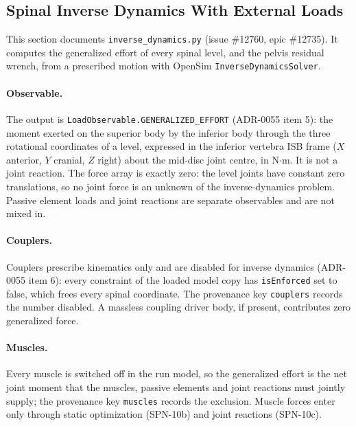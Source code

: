 \subsection{Spinal Inverse Dynamics With External Loads}
\label{sec:spn-10a}

This section documents \texttt{inverse\_dynamics.py} (issue \#12760, epic
\#12735). It computes the generalized effort of every spinal level, and the
pelvis residual wrench, from a prescribed motion with OpenSim
\texttt{InverseDynamicsSolver}.

\paragraph{Observable.}
The output is \texttt{LoadObservable.GENERALIZED\_EFFORT} (ADR-0055 item 5):
the moment exerted on the superior body by the inferior body through the three
rotational coordinates of a level, expressed in the inferior vertebra ISB
frame ($X$ anterior, $Y$ cranial, $Z$ right) about the mid-disc joint centre,
in N$\cdot$m. It is not a joint reaction. The force array is exactly zero:
the level joints have constant zero translations, so no joint force is an
unknown of the inverse-dynamics problem. Passive element loads and joint
reactions are separate observables and are not mixed in.

\paragraph{Couplers.}
Couplers prescribe kinematics only and are disabled for inverse dynamics
(ADR-0055 item 6): every constraint of the loaded model copy has
\texttt{isEnforced} set to false, which frees every spinal coordinate. The
provenance key \texttt{couplers} records the number disabled. A massless
coupling driver body, if present, contributes zero generalized force.

\paragraph{Muscles.} Every muscle is switched off in the run model, so the
generalized effort is the net joint moment that the muscles, passive elements
and joint reactions must jointly supply; the provenance key \texttt{muscles}
records the exclusion. Muscle forces enter only through static optimization
(SPN-10b) and joint reactions (SPN-10c).

